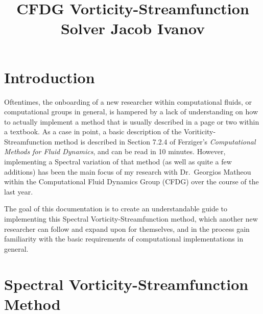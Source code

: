 \documentclass[12pt, reqno]{amsart}
\begin{document}
\title{CFDG \quad Vorticity-Streamfunction Solver \quad Jacob Ivanov}
\maketitle
\section{Introduction}
Oftentimes, the onboarding of a new researcher within computational fluids, or computational groups in general, is hampered by a lack of understanding on how to actually implement a method that is usually described in a page or two within a textbook. As a case in point, a basic description of the Voriticity-Streamfunction method is described in Section 7.2.4 of Ferziger's \textit{Computational Methods for Fluid Dynamics}, and can be read in 10 minutes. However, implementing a Spectral variation of that method (as well as quite a few additions) has been the main focus of my research with Dr.\ Georgios Matheou within the Computational Fluid Dynamics Group (CFDG) over the course of the last year.

The goal of this documentation is to create an understandable guide to implementing this Spectral Vorticity-Streamfunction method, which another new researcher can follow and expand upon for themselves, and in the process gain familiarity with the basic requirements of computational implementations in general.

\section{Spectral Vorticity-Streamfunction Method}
\end{document}
